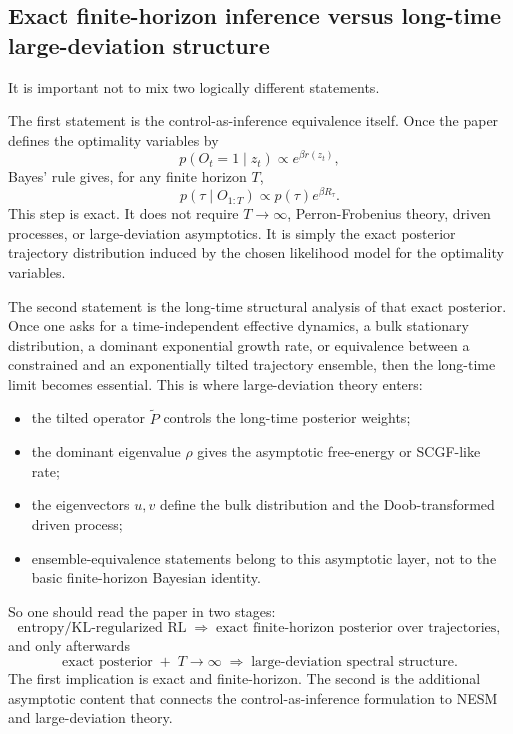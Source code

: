 \documentclass[11pt]{article}
\begin{document}
\subsection*{Exact finite-horizon inference versus long-time large-deviation structure}

It is important not to mix two logically different statements.

The first statement is the control-as-inference equivalence itself. Once the paper defines the
optimality variables by
\begin{equation}
    p(O_t=1\mid z_t)\propto e^{\beta r(z_t)},
\end{equation}
Bayes' rule gives, for any finite horizon \(T\),
\begin{equation}
    p(\tau\mid O_{1:T})
    \propto
    p(\tau)e^{\beta R_\tau}.
\end{equation}
This step is exact. It does not require \(T\to\infty\), Perron-Frobenius theory, driven
processes, or large-deviation asymptotics. It is simply the exact posterior trajectory
distribution induced by the chosen likelihood model for the optimality variables.

The second statement is the long-time structural analysis of that exact posterior. Once one asks
for a time-independent effective dynamics, a bulk stationary distribution, a dominant
exponential growth rate, or equivalence between a constrained and an exponentially tilted
trajectory ensemble, then the long-time limit becomes essential. This is where large-deviation
theory enters:
\begin{itemize}
    \item the tilted operator \(\widetilde P\) controls the long-time posterior weights;
    \item the dominant eigenvalue \(\rho\) gives the asymptotic free-energy or SCGF-like rate;
    \item the eigenvectors \(u,v\) define the bulk distribution and the Doob-transformed driven
    process;
    \item ensemble-equivalence statements belong to this asymptotic layer, not to the basic
    finite-horizon Bayesian identity.
\end{itemize}

So one should read the paper in two stages:
\begin{equation}
    \text{entropy/KL-regularized RL}
    \;\Longrightarrow\;
    \text{exact finite-horizon posterior over trajectories},
\end{equation}
and only afterwards
\begin{equation}
    \text{exact posterior}
    \;+\;
    T\to\infty
    \;\Longrightarrow\;
    \text{large-deviation spectral structure}.
\end{equation}
The first implication is exact and finite-horizon. The second is the additional asymptotic
content that connects the control-as-inference formulation to NESM and large-deviation theory.
\end{document}
